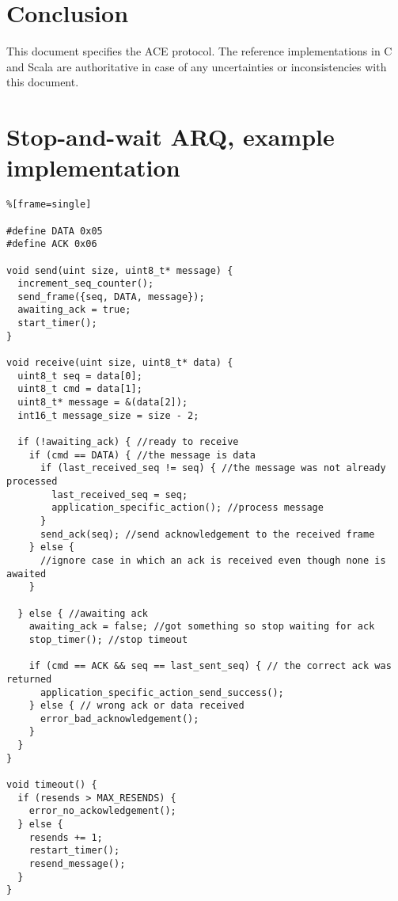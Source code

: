 \documentclass[10pt,a4paper]{article}
\begin{document}
\section{Conclusion}
This document specifies the ACE protocol. The reference implementations in C and Scala are authoritative in case of any uncertainties or inconsistencies with this document.

\newpage
\appendix
\section{Stop-and-wait ARQ, example implementation} \label{sec:example}
\lstset{language=c}
\begin{lstlisting}%[frame=single]

#define DATA 0x05
#define ACK 0x06

void send(uint size, uint8_t* message) {
  increment_seq_counter();
  send_frame({seq, DATA, message});
  awaiting_ack = true;
  start_timer();
}

void receive(uint size, uint8_t* data) {
  uint8_t seq = data[0];
  uint8_t cmd = data[1];
  uint8_t* message = &(data[2]);
  int16_t message_size = size - 2;
    
  if (!awaiting_ack) { //ready to receive
    if (cmd == DATA) { //the message is data
      if (last_received_seq != seq) { //the message was not already processed
        last_received_seq = seq;
        application_specific_action(); //process message
      } 
      send_ack(seq); //send acknowledgement to the received frame
    } else {
      //ignore case in which an ack is received even though none is awaited
    }
      
  } else { //awaiting ack
    awaiting_ack = false; //got something so stop waiting for ack
    stop_timer(); //stop timeout
    
    if (cmd == ACK && seq == last_sent_seq) { // the correct ack was returned
      application_specific_action_send_success();
    } else { // wrong ack or data received
      error_bad_acknowledgement();
    }
  }
}

void timeout() {
  if (resends > MAX_RESENDS) {
    error_no_ackowledgement();
  } else {
    resends += 1;
    restart_timer();
    resend_message();
  }
}
\end{lstlisting}



% 

%
%
\end{document}
